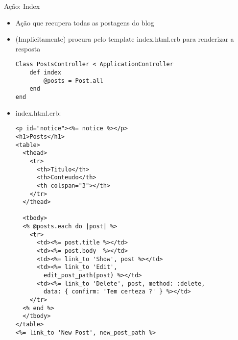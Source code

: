 \begin{frame}{Ação: Index}
	\begin{itemize}
		\item Ação que recupera \alert{todas as postagens} do blog
		\item (Implicitamente) procura pelo template \alert{index.html.erb} para renderizar a resposta
		\begin{lstlisting}[style=RubyInputStyle, caption=controllers/posts\_controller.rb]
Class PostsController < ApplicationController
	def index
		@posts = Post.all
	end
end 
		\end{lstlisting}		
		\framebreak
		\item \alert{index.html.erb}:
		\begin{lstlisting}[style=RubyInputStyle, caption=views/posts/index.html.erb]
<p id="notice"><%= notice %></p>
<h1>Posts</h1>
<table>
  <thead>
    <tr>
      <th>Titulo</th>
      <th>Conteudo</th>
      <th colspan="3"></th>
    </tr>
  </thead>

  <tbody>
  <% @posts.each do |post| %>
    <tr>
      <td><%= post.title %></td>
      <td><%= post.body  %></td>
      <td><%= link_to 'Show', post %></td>
      <td><%= link_to 'Edit', 
      	edit_post_path(post) %></td>
      <td><%= link_to 'Delete', post, method: :delete, 
        data: { confirm: 'Tem certeza ?' } %></td>
    </tr>
  <% end %>
  </tbody>
</table>	
<%= link_to 'New Post', new_post_path %>	
\end{lstlisting}
	\end{itemize}	
\end{frame}